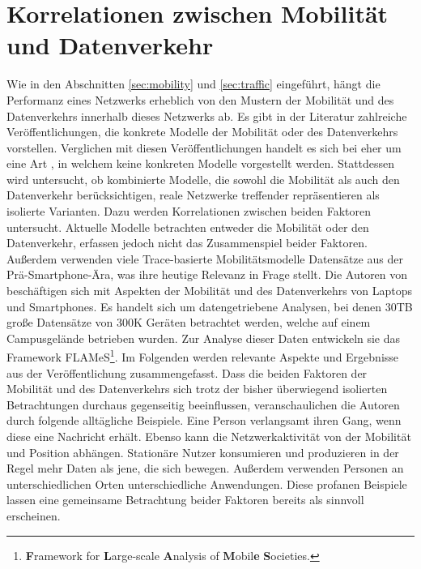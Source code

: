 \documentclass[12pt, a4paper]{article}
\begin{document}
\section{Korrelationen zwischen Mobilität und Datenverkehr}
\label{sec:correlations}

Wie in den Abschnitten \ref{sec:mobility} und \ref{sec:traffic} eingeführt, hängt die Performanz eines
Netzwerks erheblich von den Mustern der Mobilität und des Datenverkehrs innerhalb dieses Netzwerks ab.
Es gibt in der Literatur zahlreiche Veröffentlichungen, die konkrete Modelle der Mobilität oder des Datenverkehrs
vorstellen. Verglichen mit diesen Veröffentlichungen handelt es sich bei \cite{Alipour2018} eher um eine Art 
, in welchem keine konkreten Modelle vorgestellt werden. Stattdessen wird untersucht, 
ob kombinierte Modelle, die sowohl die Mobilität als auch den Datenverkehr berücksichtigen, reale Netzwerke 
treffender repräsentieren als isolierte Varianten. Dazu werden Korrelationen zwischen beiden Faktoren untersucht.\newline
Aktuelle Modelle betrachten entweder die Mobilität oder den Datenverkehr, erfassen jedoch nicht das Zusammenspiel beider Faktoren.
Außerdem verwenden viele Trace-basierte Mobilitätsmodelle Datensätze aus der Prä-Smartphone-Ära,
was ihre heutige Relevanz in Frage stellt. \cite{Alipour2018}
Die Autoren von \cite{Alipour2018} beschäftigen sich mit Aspekten der Mobilität und des Datenverkehrs von Laptops und Smartphones.
Es handelt sich um datengetriebene Analysen, bei denen $30$\textsc{TB} große Datensätze von $300$\textsc{K} Geräten betrachtet werden,
welche auf einem Campusgelände betrieben wurden. Zur Analyse dieser Daten entwickeln sie das Framework FLAMeS\footnote{
\textbf{F}ramework for \textbf{L}arge-scale \textbf{A}nalysis of \textbf{M}obil\textbf{e} \textbf{S}ocieties.}.
Im Folgenden werden relevante Aspekte und Ergebnisse aus der Veröffentlichung zusammengefasst.\newline
Dass die beiden Faktoren der Mobilität und des Datenverkehrs sich trotz der bisher überwiegend isolierten Betrachtungen
durchaus gegenseitig beeinflussen, veranschaulichen die Autoren durch folgende alltägliche Beispiele. 
Eine Person verlangsamt ihren Gang, wenn diese eine Nachricht erhält. Ebenso kann die Netzwerkaktivität von der
Mobilität und Position abhängen. Stationäre Nutzer konsumieren und produzieren in der Regel mehr Daten als jene, 
die sich bewegen. Außerdem verwenden Personen an unterschiedlichen Orten unterschiedliche Anwendungen.
Diese profanen Beispiele lassen eine gemeinsame Betrachtung beider Faktoren bereits als sinnvoll erscheinen.
\end{document}
